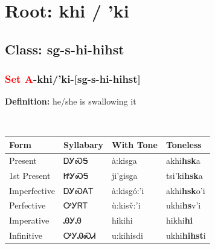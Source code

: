 \needspace{4in}
\section*{Root: khi / 'ki}
\nopagebreak
{}
\needspace{3in}
\subsection*{Class: sg-s-hi-hihst}
\nopagebreak
\needspace{2in}
\subsubsection*{\textcolor{Red}{Set A}{-}\textbf{khi/'ki}{-}[sg-s-hi-hihst]}
\nopagebreak
\textbf{Definition: } he/she is swallowing it
\\[0.5em]
\begin{tabularx}{\textwidth}{l X X X}%
\toprule%
\textbf{Form}&\textbf{Syllabary}&\textbf{With Tone}&\textbf{Toneless}\\%
\midrule%
Present&ᎠᎩᏍᎦ&à:kisga&akhi\textbf{hsk}a\\%
1st Present&ᏥᎩᏍᎦ&ji’gisga&tsi'ki\textbf{hsk}a\\%
Imperfective&ᎠᎩᏍᎪᎢ&à:kisgó:’i&akhi\textbf{hsk}o'i\\%
Perfective&ᎤᎩᏒᎢ&ù:kisv̌:’i&ukhi\textbf{hs}v'i\\%
Imperative&ᎯᎩᎯ&hikihi&hikhi\textbf{hi}\\%
Infinitive&ᎤᎩᎯᏍᏗ&u:kihisdi&ukhi\textbf{hihst}i\\%
\bottomrule%
\end{tabularx}
\\[1em]